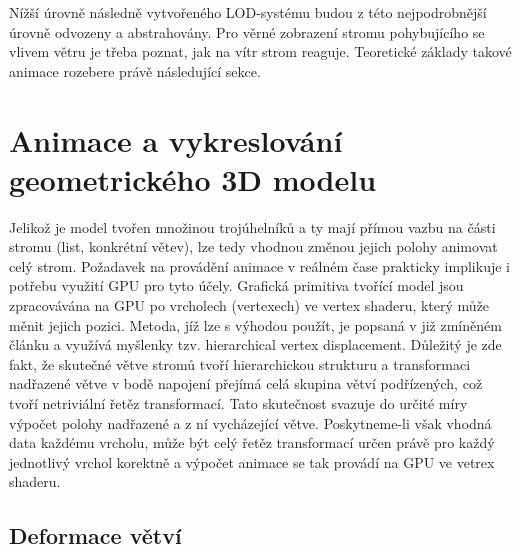 Nížší úrovně následně vytvořeného LOD-systému budou z této nejpodrobnější úrovně odvozeny a abstrahovány. Pro věrné zobrazení stromu pohybujícího se vlivem větru je třeba poznat, jak na vítr strom reaguje. Teoretické základy takové animace rozebere právě následující sekce.

\section{Animace a vykreslování geometrického 3D modelu}
\label{sec-animation3D}

Jelikož je model tvořen množinou trojúhelníků a ty mají přímou vazbu na části stromu (list, konkrétní větev), lze tedy vhodnou změnou jejich polohy animovat celý strom. Požadavek na provádění animace v reálném čase prakticky implikuje i potřebu využití GPU pro tyto účely. Grafická primitiva tvořící model jsou zpracovávána na GPU po vrcholech (vertexech) ve vertex shaderu, který může měnit jejich pozici. 
Metoda, jíž lze s výhodou použít, je popsaná v již zmíněném článku \cite{Habel_09_PGT} a využívá myšlenky tzv. hierarchical vertex displacement. Důležitý je zde fakt, že skutečné větve stromů tvoří hierarchickou strukturu a transformaci nadřazené větve v bodě napojení přejímá celá skupina větví podřízených, což tvoří netriviální řetěz transformací. Tato skutečnost svazuje do určité míry výpočet polohy nadřazené a z ní vycházející větve. Poskytneme-li však vhodná data každému vrcholu, může být celý řetěz transformací určen právě pro každý jednotlivý vrchol korektně a výpočet animace se tak provádí na GPU ve vetrex shaderu.

\subsection{Deformace větví}
\label{sec-branchDeformation}

